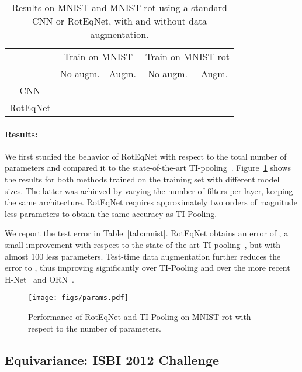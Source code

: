 \documentclass[10pt,twocolumn,letterpaper,table]{article}
\begin{document}
\begin{table}[h]
\label{tab:mnist_aug}
\begin{tabular}{c|c|c|c|c|}
\cline{2-5}
& \multicolumn{2}{c}{Train on MNIST} & \multicolumn{2}{|c|}{Train on MNIST-rot}\\
\cline{2-5}
& No augm. & Augm. & No augm. & Augm.\\
\cline{1-5}
\multicolumn{1}{|c|}{CNN} &  &  &  & \\
\cline{1-5}
\multicolumn{1}{|c|}{RotEqNet} &  &  &  &  \\
\cline{1-5}
\end{tabular}
\vspace{0.01cm}
\caption{Results on MNIST and MNIST-rot using a standard CNN or RotEqNet, with and without data augmentation.}
\vspace*{-2mm}
\end{table}
\paragraph{Results:} We first studied the behavior of RotEqNet with respect to the total number of parameters and compared it to the state-of-the-art TI-pooling~\cite{laptev2016ti}. Figure~\ref{fig:params} shows the results for both methods trained on the training set with different model sizes. The latter was achieved by varying the number of filters per layer, keeping the same architecture. RotEqNet requires approximately two orders of magnitude less parameters to obtain the same accuracy as TI-Pooling.

We report the test error in Table~\ref{tab:mnist}. RotEqNet obtains an error of , a small improvement with respect to the state-of-the-art TI-pooling~\cite{laptev2016ti}, but with almost 100 less parameters. Test-time data augmentation further reduces the error to , thus improving significantly over TI-Pooling and over the more recent H-Net~\cite{worrall2016harmonic} and ORN~\cite{zhou2017oriented}.

\begin{figure}[!t]
\centering
	\texttt{[image: figs/params.pdf]}
    \caption{Performance of RotEqNet and TI-Pooling on MNIST-rot with respect to the number of parameters.}
    \label{fig:params}
    \vspace{-3mm}
\end{figure}
	
\subsection{Equivariance: ISBI 2012 Challenge}
\end{document}
